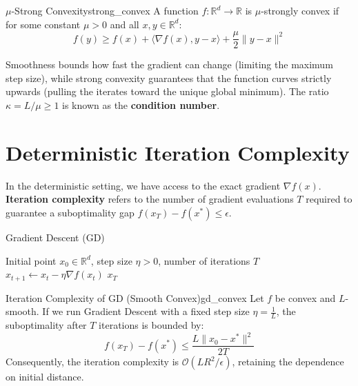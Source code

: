 \documentclass[11pt]{article}
\begin{document}
\begin{definition}{$\mu$-Strong Convexity}{strong_convex}
A function $f: \mathbb{R}^d \to \mathbb{R}$ is $\mu$-strongly convex if for some constant $\mu > 0$ and all $x, y \in \mathbb{R}^d$:
\begin{equation}
    f(y) \ge f(x) + \langle \nabla f(x), y - x \rangle + \frac{\mu}{2}\|y - x\|^2
\end{equation}
\end{definition}

\begin{interpretation}
Smoothness bounds how fast the gradient can change (limiting the maximum step size), while strong convexity guarantees that the function curves strictly upwards (pulling the iterates toward the unique global minimum). The ratio $\kappa = L / \mu \ge 1$ is known as the \textbf{condition number}.
\end{interpretation}

\section{Deterministic Iteration Complexity}

In the deterministic setting, we have access to the exact gradient $\nabla f(x)$. \textbf{Iteration complexity} refers to the number of gradient evaluations $T$ required to guarantee a suboptimality gap $f(x_T) - f(x^*) \le \epsilon$.

\begin{algobox}{Gradient Descent (GD)}
\begin{algorithmic}[1]
\Require Initial point $x_0 \in \mathbb{R}^d$, step size $\eta > 0$, number of iterations $T$
    \State $x_{t+1} \gets x_t - \eta \nabla f(x_t)$
\EndFor
\Ensure $x_T$
\end{algorithmic}
\end{algobox}

\begin{theorem}{Iteration Complexity of GD (Smooth Convex)}{gd_convex}
Let $f$ be convex and $L$-smooth. If we run Gradient Descent with a fixed step size $\eta = \frac{1}{L}$, the suboptimality after $T$ iterations is bounded by:
\begin{equation}
    f(x_T) - f(x^*) \le \frac{L \|x_0 - x^*\|^2}{2T}
\end{equation}
Consequently, the iteration complexity is $\mathcal{O}(LR^2/\epsilon)$, retaining the dependence on initial distance.
\end{theorem}
\end{document}
